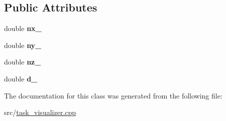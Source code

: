 \subsection*{Public Attributes}
\begin{DoxyCompactItemize}
\item 
\hypertarget{classhiqp_1_1TaskVisualPlane_ab790d519f98ca0dd211ab0a1f2a189c5}{double {\bfseries nx\-\_\-}}\label{classhiqp_1_1TaskVisualPlane_ab790d519f98ca0dd211ab0a1f2a189c5}

\item 
\hypertarget{classhiqp_1_1TaskVisualPlane_a63abc244f4fcd197826878cc684c8557}{double {\bfseries ny\-\_\-}}\label{classhiqp_1_1TaskVisualPlane_a63abc244f4fcd197826878cc684c8557}

\item 
\hypertarget{classhiqp_1_1TaskVisualPlane_a4970d47a59369760c6768b6974d3f485}{double {\bfseries nz\-\_\-}}\label{classhiqp_1_1TaskVisualPlane_a4970d47a59369760c6768b6974d3f485}

\item 
\hypertarget{classhiqp_1_1TaskVisualPlane_a427c06f4ef32e4c2551cf3ea97fa029e}{double {\bfseries d\-\_\-}}\label{classhiqp_1_1TaskVisualPlane_a427c06f4ef32e4c2551cf3ea97fa029e}

\end{DoxyCompactItemize}


The documentation for this class was generated from the following file\-:\begin{DoxyCompactItemize}
\item 
src/\hyperlink{task__visualizer_8cpp}{task\-\_\-visualizer.\-cpp}\end{DoxyCompactItemize}
